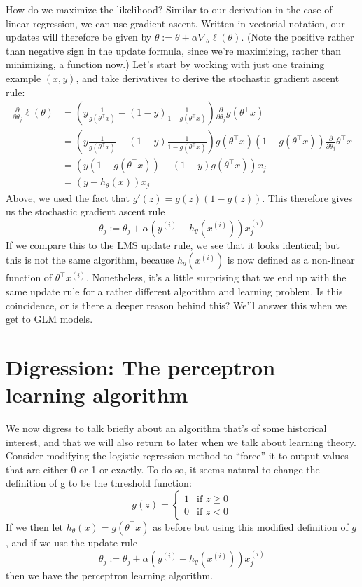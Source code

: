 How do we maximize the likelihood? Similar to our derivation in the case
of linear regression, we can use gradient ascent. Written in vectorial notation,
our updates will therefore be given by $\theta := \theta + \alpha \nabla_\theta \ell(\theta)$. (Note the positive
rather than negative sign in the update formula, since we're maximizing,
rather than minimizing, a function now.) Let's start by working with just
one training example $(x,y)$, and take derivatives to derive the stochastic
gradient ascent rule:
\begin{align}
    \frac{\partial}{\partial \theta_j}\ell(\theta) &=
    \left(y \frac{1}{g(\theta^\top x)} - (1-y) \frac{1}{1-g(\theta^\top x)} \right) \frac{\partial}{\partial \theta_j}g(\theta^\top x)\\
    &= \left(y \frac{1}{g(\theta^\top x)} - (1-y) \frac{1}{1-g(\theta^\top x)} \right) g(\theta^\top x) (1 - g(\theta^\top x)) \frac{\partial}{\partial \theta_j}\theta^\top x\\
    &= \left(y (1 - g(\theta^\top x)) - (1-y) g(\theta^\top x)\right) x_j\\
    &= (y - h_\theta(x)) x_j
\end{align}
Above, we used the fact that $g'(z) = g(z)(1 - g(z))$. This therefore gives us
the stochastic gradient ascent rule
\begin{equation}
    \theta_j := \theta_j + \alpha \left( y^{(i)} - h_\theta (x^{(i)}) \right) x^{(i)}_j
\end{equation}
If we compare this to the LMS update rule, we see that it looks identical; but
this is not the same algorithm, because $h_\theta (x^{(i)})$ is now defined as a non-linear
function of $\theta^\top x^{(i)}$. Nonetheless, it's a little surprising that we end up with
the same update rule for a rather different algorithm and learning problem.
Is this coincidence, or is there a deeper reason behind this? We'll answer this
when we get to GLM models.


\section{Digression: The perceptron learning algorithm} %
We now digress to talk briefly about an algorithm that's of some historical
interest, and that we will also return to later when we talk about learning
theory. Consider modifying the logistic regression method to ``force'' it to
output values that are either 0 or 1 or exactly. To do so, it seems natural to
change the definition of g to be the threshold function:
\begin{equation}
    g(z) = \begin{cases}
        1 & \text{if } z \ge 0\\
        0 & \text{if } z < 0
    \end{cases}
\end{equation}
If we then let $h_\theta (x) = g(\theta^\top x)$ as before but using this modified definition of
$g$, and if we use the update rule
\begin{equation}
    \theta_j := \theta_j + \alpha \left( y^{(i)} - h_\theta (x^{(i)} ) \right) x^{(i)}_j    
\end{equation}
then we have the perceptron learning algorithm. %

